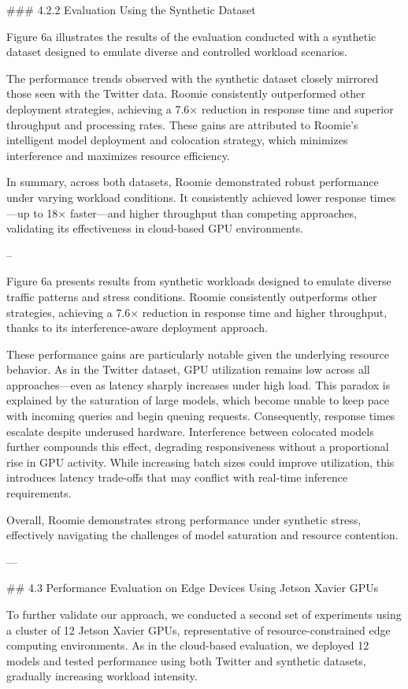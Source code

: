 ### 4.2.2 Evaluation Using the Synthetic Dataset

Figure 6a illustrates the results of the evaluation conducted with a synthetic dataset designed to emulate diverse and controlled workload scenarios.

The performance trends observed with the synthetic dataset closely mirrored those seen with the Twitter data. Roomie consistently outperformed other deployment strategies, achieving a 7.6× reduction in response time and superior throughput and processing rates. These gains are attributed to Roomie’s intelligent model deployment and colocation strategy, which minimizes interference and maximizes resource efficiency.

In summary, across both datasets, Roomie demonstrated robust performance under varying workload conditions. It consistently achieved lower response times—up to 18× faster—and higher throughput than competing approaches, validating its effectiveness in cloud-based GPU environments.

--

Figure 6a presents results from synthetic workloads designed to emulate diverse traffic patterns and stress conditions. Roomie consistently outperforms other strategies, achieving a 7.6× reduction in response time and higher throughput, thanks to its interference-aware deployment approach.

These performance gains are particularly notable given the underlying resource behavior. As in the Twitter dataset, GPU utilization remains low across all approaches—even as latency sharply increases under high load. This paradox is explained by the saturation of large models, which become unable to keep pace with incoming queries and begin queuing requests. Consequently, response times escalate despite underused hardware. Interference between colocated models further compounds this effect, degrading responsiveness without a proportional rise in GPU activity. While increasing batch sizes could improve utilization, this introduces latency trade-offs that may conflict with real-time inference requirements.

Overall, Roomie demonstrates strong performance under synthetic stress, effectively navigating the challenges of model saturation and resource contention.

---

## 4.3 Performance Evaluation on Edge Devices Using Jetson Xavier GPUs

To further validate our approach, we conducted a second set of experiments using a cluster of 12 Jetson Xavier GPUs, representative of resource-constrained edge computing environments. As in the cloud-based evaluation, we deployed 12 models and tested performance using both Twitter and synthetic datasets, gradually increasing workload intensity.

